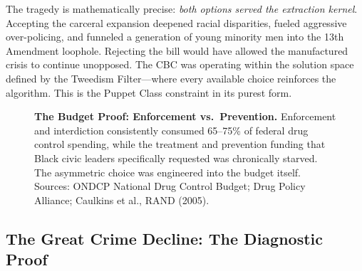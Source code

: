The tragedy is mathematically precise: \textit{both options served the extraction kernel}. Accepting the carceral expansion deepened racial disparities, fueled aggressive over-policing, and funneled a generation of young minority men into the 13th Amendment loophole. Rejecting the bill would have allowed the manufactured crisis to continue unopposed. The CBC was operating within the solution space defined by the Tweedism Filter---where every available choice reinforces the algorithm. This is the Puppet Class constraint in its purest form.

\begin{figure}[htbp]
\centering
{}
\caption[The Budget Proof]{\textbf{The Budget Proof: Enforcement vs.\ Prevention.} Enforcement and interdiction consistently consumed 65--75\% of federal drug control spending, while the treatment and prevention funding that Black civic leaders specifically requested was chronically starved. The asymmetric choice was engineered into the budget itself. Sources: ONDCP National Drug Control Budget; Drug Policy Alliance; Caulkins et al., RAND (2005).}
\label{fig:drug_spending}
\end{figure}

\subsection{The Great Crime Decline: The Diagnostic Proof}

